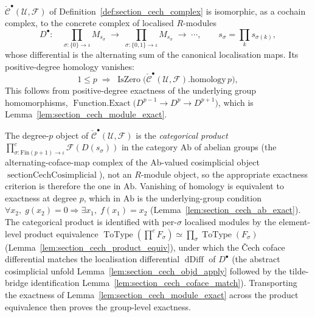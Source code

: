 \begin{lemma}
  \(\check{\mathcal{C}}^\bullet(\mathcal{U}, \mathcal{F})\) of
  Definition~\ref{def:section_cech_complex} is isomorphic, as a cochain complex, to
  the concrete complex of localised \(R\)-modules
  \[
    D^\bullet : \quad
    \prod_{\sigma : \{0\} \to \iota} M_{s_\sigma} \;\longrightarrow\;
    \prod_{\sigma : \{0,1\} \to \iota} M_{s_\sigma} \;\longrightarrow\;
    \cdots,
    \qquad
    s_\sigma = \prod_{k} s_{\sigma(k)},
  \]
  whose differential is the alternating sum of the canonical localisation maps. Its
  positive-degree homology vanishes:
  \[
    1 \leq p
    \;\Longrightarrow\;
    \operatorname{IsZero}\bigl(\check{\mathcal{C}}^\bullet(\mathcal{U},
      \mathcal{F}).\mathrm{homology}\, p\bigr),
  \]
  This follows from positive-degree exactness of the underlying group
  homomorphisms,
  \(\operatorname{Function.Exact}\bigl(D^{p-1} \to D^p \to D^{p+1}\bigr)\), which is
  Lemma~\ref{lem:section_cech_module_exact}.

  The degree-\(p\) object of
  \(\check{\mathcal{C}}^\bullet(\mathcal{U}, \mathcal{F})\) is the \emph{categorical
  product}
  \(\prod^{c}_{\sigma : \mathrm{Fin}(p+1) \to \iota}
  \mathcal{F}(D(s_\sigma))\) in the category \(\mathrm{Ab}\) of abelian groups (the
  alternating-coface-map complex of the \(\mathrm{Ab}\)-valued cosimplicial object
  \(\operatorname{sectionCechCosimplicial}\)), not an \(R\)-module object, so the
  appropriate exactness criterion is therefore the one in \(\mathrm{Ab}\). Vanishing
  of homology is equivalent to exactness at degree \(p\), which in \(\mathrm{Ab}\) is
  the underlying-group condition
  \(\forall x_2,\; g(x_2)=0\Rightarrow\exists x_1,\;f(x_1)=x_2\)
  (Lemma~\ref{lem:section_cech_ab_exact}). The categorical product is identified with
  per-\(\sigma\) localised modules by the element-level product equivalence
  \(\operatorname{ToType}(\prod^{c} F_\sigma) \simeq \prod_\sigma
  \operatorname{ToType}(F_\sigma)\)
  (Lemma~\ref{lem:section_cech_product_equiv}), under which the {\v C}ech coface
  differential matches the localisation differential \(\operatorname{dDiff}\) of
  \(D^\bullet\) (the abstract cosimplicial unfold
  Lemma~\ref{lem:section_cech_objd_apply} followed by the tilde-bridge identification
  Lemma~\ref{lem:section_cech_coface_match}). Transporting the exactness of
  Lemma~\ref{lem:section_cech_module_exact} across the product equivalence then
  proves the group-level exactness.
\end{lemma}

